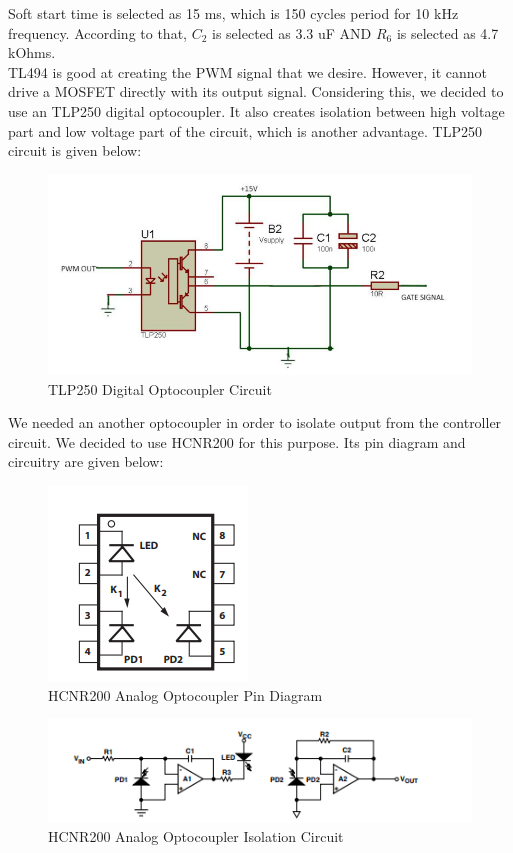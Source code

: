 \documentclass{article}
\newcommand\tab[1][1cm]{\hspace*{#1}}
\begin{document}
\tab Soft start time is selected as 15 ms, which is 150 cycles period for 10 kHz frequency. According to that, $C_2$ is selected as 3.3 uF AND $R_6$ is selected as 4.7 kOhms. \\

\tab TL494 is good at creating the PWM signal that we desire. However, it cannot drive a MOSFET directly with its output signal. Considering this, we decided to use an TLP250 digital optocoupler. It also creates isolation between high voltage part and low voltage part of the circuit, which is another advantage. TLP250 circuit is given below:

\begin{figure}[H]
    \centering
    \includegraphics[scale=0.5]{opto.PNG}
    \caption{TLP250 Digital Optocoupler Circuit}
    \label{fig:my_label}
\end{figure}
\tab We needed an another optocoupler in order to isolate output from the controller circuit. We decided to use HCNR200 for this purpose. Its pin diagram and circuitry are given below:
\begin{figure}[H]
    \centering
    \includegraphics[scale=0.8]{analog opto.PNG}
    \caption{HCNR200 Analog Optocoupler Pin Diagram}
    \label{fig:my_label}
\end{figure}

\begin{figure}[H]
    \centering
    \includegraphics[scale=1]{analog opto devre.PNG}
    \caption{HCNR200 Analog Optocoupler Isolation Circuit}
    \label{fig:my_label}
\end{figure}
\end{document}
